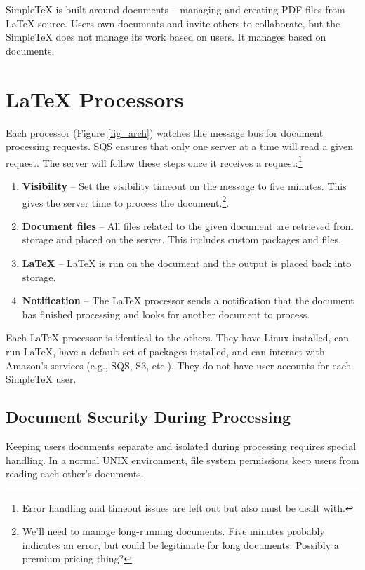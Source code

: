 \documentclass[11pt]{article}
\newcommand\STex{Simple\TeX\xspace}
\newcommand\LTex{\LaTeX\xspace}
\begin{document}
\STex is built around documents -- managing and creating PDF files
from \LTex source. Users own documents and invite others to
collaborate, but the \STex does not manage its work based on users. It
manages based on documents.

\section{\LTex Processors}

Each \LTEx processor (Figure \ref{fig_arch}) watches the message bus
for document processing requests. SQS ensures that only one server at
a time will read a given request. The server will follow these steps
once it receives a request:\footnote{Error handling and timeout issues
  are left out but also must be dealt with.}

\begin{enumerate}
\item \textbf{Visibility} -- Set the visibility timeout on the message
  to five minutes. This gives the server time to process the
  document.\footnote{We'll need to manage long-running documents. Five
    minutes probably indicates an error, but could be legitimate for
    long documents. Possibly a premium pricing thing?}.
\item \textbf{Document files} -- All files related to the given document are retrieved from storage and placed on the server. This includes custom packages and files.
\item \textbf{\LTex} -- \LTex is run on the document and the output is placed back into storage.
\item \textbf{Notification} -- The \LTex processor sends a notification that the document has finished processing and looks for another document to process.
\end{enumerate}

Each \LTex processor is identical to the others. They have Linux
installed, can run \LTex, have a default set of packages installed,
and can interact with Amazon's services (e.g., SQS, S3, etc.). They do
not have user accounts for each \STex user. 

\subsection{Document Security During Processing}

Keeping users documents separate and isolated during processing
requires special handling. In a normal UNIX environment, file system
permissions keep users from reading each other's documents. 
\end{document}
